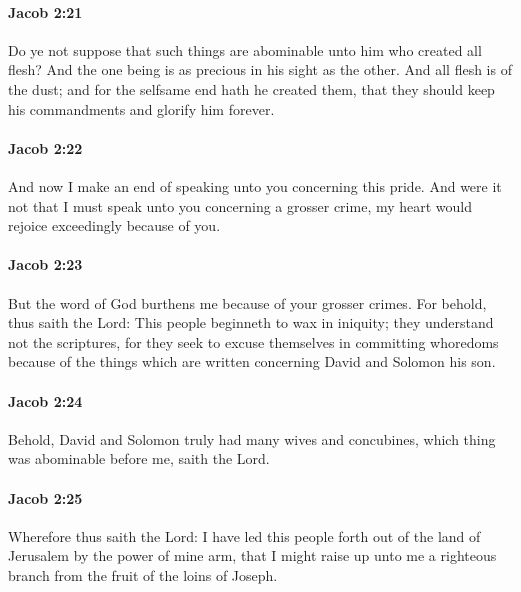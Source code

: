 		\paragraph{Jacob 2:21} %
			\label{JACOB-2-21}

			Do ye not suppose that such things are abominable
			unto him who created all flesh?
			And the one being is as precious in his sight as the other.
			And all flesh is of the dust;
			and for the selfsame end hath he created them,
			that they should keep his commandments and glorify him forever.

		\paragraph{Jacob 2:22} %
			\label{JACOB-2-22}

			And now I make an end of speaking unto you concerning this pride.
			And were it not that I must speak unto you concerning a grosser crime,
			my heart would rejoice exceedingly because of you.

		\paragraph{Jacob 2:23} %
			\label{JACOB-2-23}

			But the word of God burthens me because of your grosser crimes.
			For behold, thus saith the Lord:
			This people beginneth to wax in iniquity;
			they understand not the scriptures,
			for they seek to excuse themselves in committing whoredoms
			because of the things which are written concerning David and Solomon his son.

		\paragraph{Jacob 2:24} %
			\label{JACOB-2-24}

			Behold, David and Solomon truly had many wives and concubines,
			which thing was abominable before me, saith the Lord.

		\paragraph{Jacob 2:25} %
			\label{JACOB-2-25}

			Wherefore thus saith the Lord:
			I have led this people forth out of the land of Jerusalem
			by the power of mine arm,
			that I might raise up unto me a righteous branch
			from the fruit of the loins of Joseph.

